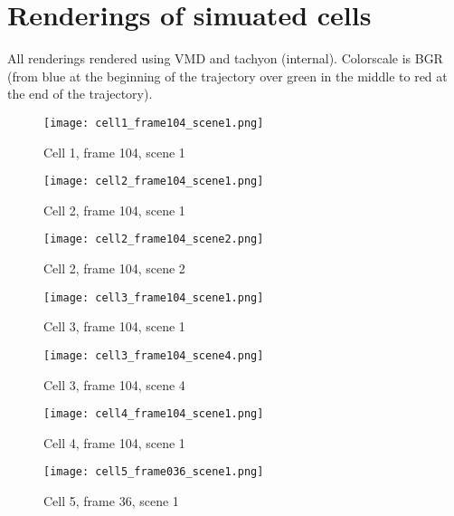 
\chapter{Renderings of simuated cells} %
\label{cha:renderings_of_simuated_cells}

\newcommand{\cellrenderingwidth}{8cm}
\newcommand{\cellrenderingheight}{8cm}

All renderings rendered using VMD\cite{humphrey_vmd_1996} and tachyon\cite{stone_em_1998} (internal). Colorscale is BGR (from blue at the beginning of the trajectory over green in the middle to red at the end of the trajectory).

\begin{figure}[H]
\centering
  \texttt{[image: cell1\_frame104\_scene1.png]}
  \caption{Cell 1, frame 104, scene 1}
  \label{img:cell1_frame104_scene1}
\end{figure}

\begin{figure}[H]
\centering
  \texttt{[image: cell2\_frame104\_scene1.png]}
  \caption{Cell 2, frame 104, scene 1}
  \label{img:cell2_frame104_scene1}
\end{figure}

\begin{figure}[H]
\centering
  \texttt{[image: cell2\_frame104\_scene2.png]}
  \caption{Cell 2, frame 104, scene 2}
  \label{img:cell2_frame104_scene2}
\end{figure}

\begin{figure}[H]
\centering
  \texttt{[image: cell3\_frame104\_scene1.png]}
  \caption{Cell 3, frame 104, scene 1}
  \label{img:cell3_frame104_scene1}
\end{figure}

\begin{figure}[H]
\centering
  \texttt{[image: cell3\_frame104\_scene4.png]}
  \caption{Cell 3, frame 104, scene 4}
  \label{img:cell3_frame104_scene4}
\end{figure}

\begin{figure}[H]
\centering
  \texttt{[image: cell4\_frame104\_scene1.png]}
  \caption{Cell 4, frame 104, scene 1}
  \label{img:cell4_frame104_scene1}
\end{figure}

\begin{figure}[H]
\centering
  \texttt{[image: cell5\_frame036\_scene1.png]}
  \caption{Cell 5, frame 36, scene 1}
  \label{img:cell5_frame036_scene1}
\end{figure}

